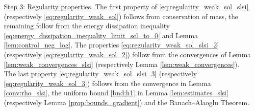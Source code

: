 \documentclass[reqno, 11pt]{amsart}
\numberwithin{equation}{section}
\theoremstyle{definition}
\begin{document}
\smallskip

\underline{Step 3: Regularity properties.} The first property of \eqref{eq:regularity_weak_sol_slsi} (respectively \eqref{eq:regularity_weak_sol}) follows from conservation of mass, the remaining follow from the energy dissipation inequality \eqref{eq:energy_dissipation_inequality_limit_scl_to_0} and Lemma \ref{lem:control_neg_log}. The properties \eqref{eq:regularity_weak_sol_slsi_2} (respectively \eqref{eq:regularity_weak_sol_2}) follow from the convergences of Lemma \ref{lem:weak_convergences_slsi} (respectively Lemma \ref{lem:weak_convergences}). The last property \eqref{eq:regularity_weak_sol_slsi_3} (respectively \eqref{eq:regularity_weak_sol_3}) follows from the convergence in Lemma \ref{conv:rho_slsi}, the uniform bound \ref{bnd:h1} in Lemma \ref{lem:estimates_slsi} (respectively Lemma \ref{prop:bounds_gradient}) and the Banach--Alaoglu Theorem.
\end{document}
